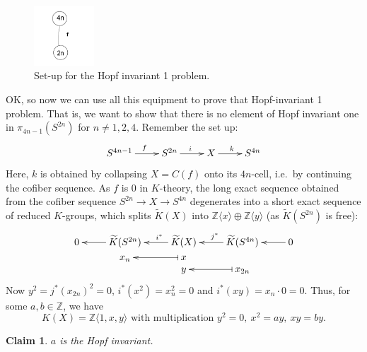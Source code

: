 \documentclass{article}
\newcommand{\Z}{\mathbb{Z}}
\newcommand{\from}{\leftarrow}
\newtheorem{claim}[thm]{Claim}
\begin{document}
\begin{figure}
\centering\includegraphics[width=0.2\textwidth]{figures/16.pdf}
\caption{\small Set-up for the Hopf invariant 1 problem.}
\end{figure}
OK, so now we can use all this equipment to prove that Hopf-invariant 1 problem. That is, we want to show that there is no element of Hopf invariant one in $\pi_{4n-1}(S^{2n})$ for $n\neq1,2,4$. Remember the set up:
\[\xymatrix{
S^{4n-1}\ar[r]^f & S^{2n} \ar[r]^i & X \ar[r]^k & S^{4n}
}\]
Here, $k$ is obtained by collapsing $X=C(f)$ onto its $4n$-cell, i.e.\ by continuing the cofiber sequence. As $f$ is 0 in $K$-theory, the long exact sequence obtained from the cofiber sequence $S^{2n}\to X\to S^{4n}$ degenerates into a short exact sequence of reduced $K$-groups, which splits $\widetilde K(X)$ into $\Z\langle x\rangle\oplus\Z\langle y\rangle$ (as $\widetilde K(S^{2n})$ is free):
\[\xymatrix@R=0mm{
0&\ar[l]\widetilde K(S^{2n})&\ar[l]_{\ \ \ i^*}\widetilde K(X)&\ar[l]_{\ j^*}\widetilde K(S^{4n})&0\ar[l]\\
&x_n&\ar@{|->}[l]x\\
&&y&\ar@{|->}[l]x_{2n}
}\]
Now $y^2=j^*(x_{2n})^2=0$, $i^*(x^2)=x_n^2=0$ and $i^*(xy)=x_n\cdot0=0$. Thus, for some $a,b\in\Z$, we have
\[K(X)=\Z\langle1,x,y\rangle\text{ with multiplication }y^2=0,\ x^2=ay,\ xy=by.\]
\begin{claim}
$a$ is the Hopf invariant.
\end{claim}
\end{document}
